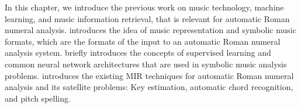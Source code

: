 

In this chapter, we introduce the previous work on music
technology, machine learning, and music information
retrieval, that is relevant for automatic Roman numeral
analysis.  introduces the idea
of music representation and symbolic music formats, which
are the formats of the input to an automatic Roman numeral
analysis system.  briefly
introduces the concepts of supervised learning and common
neural network architectures that are used in symbolic music
analysis problems.  introduces the existing MIR techniques for automatic Roman numeral analysis and its satellite problems: Key estimation, automatic chord recognition, and pitch spelling.
